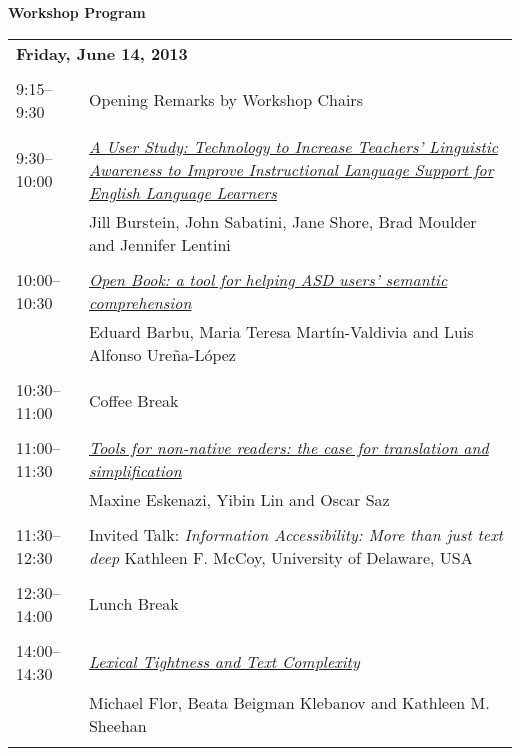 \setlength{\parindent}{0in}
\setlength{\parskip}{2ex}
\renewcommand{\baselinestretch}{0.87}

\begin{center}
{\Large \bf
  Workshop Program}




\end{center}
\vspace{3mm}
\begin{tabular}{p{20mm}p{128mm}}
\multicolumn{2}{l}{\bf Friday, June 14, 2013} \\
\\
9:15--9:30 & Opening Remarks by Workshop Chairs \\
\\
9:30--10:00 & \hyperlink{page.1}{\em A User Study: Technology to Increase Teachers' Linguistic Awareness to Improve Instructional Language Support for English Language Learners}\\
         & Jill Burstein, John Sabatini, Jane Shore, Brad Moulder and Jennifer Lentini \\
\\

10:00--10:30 & \hyperlink{page.11}{\em Open Book: a tool for helping ASD users' semantic comprehension}\\
         & Eduard Barbu, Maria Teresa Mart\'{i}n-Valdivia and Luis Alfonso Ure\~{n}a-L\'{o}pez \\
\\

10:30--11:00 & Coffee Break \\
\\
11:00--11:30 & \hyperlink{page.20}{\em Tools for non-native readers: the case for translation and simplification}\\
         & Maxine Eskenazi, Yibin Lin and Oscar Saz \\
\\

11:30--12:30 & Invited Talk: {\em Information Accessibility: More than just text deep} \newline Kathleen F. McCoy, University of Delaware, USA \\
\\
12:30--14:00 & Lunch Break \\
\\
14:00--14:30 & \hyperlink{page.29}{\em Lexical Tightness and Text Complexity}\\
         & Michael Flor, Beata Beigman Klebanov and Kathleen M. Sheehan \\
\\


\end{tabular}
